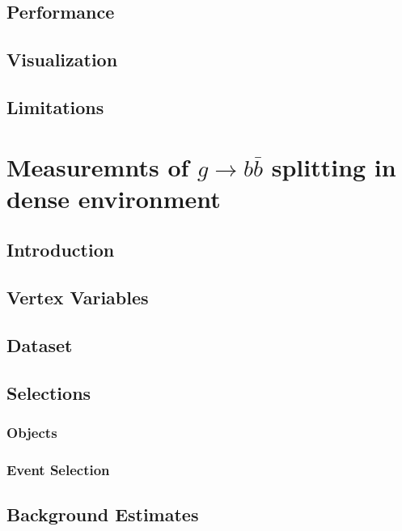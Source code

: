 \documentclass{report}
\begin{document}
\section{Performance}


\section{Visualization}


\section{Limitations}


\chapter{Measuremnts of $g\rightarrow b\bar{b}$ splitting in dense environment}
\label{chap:gbb}
\section{Introduction}


\section{Vertex Variables}


\section{Dataset}


\section{Selections}
\subsection{Objects}

\subsection{Event Selection}


\section{Background Estimates}


\end{document}
